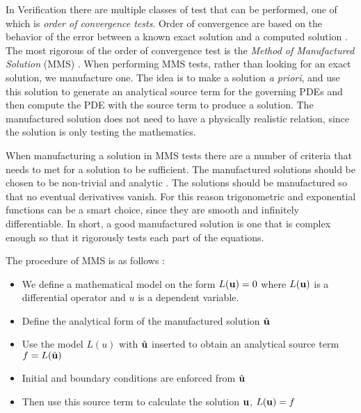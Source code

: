 In Verification there are multiple classes of test that can be performed, one of which is \textit{order of convergence tests}. Order of convergence are based on the behavior of the error between a known exact solution and a computed solution \cite{Roache2002}. The most rigorous of the order of convergence test is the \textit{Method of Manufactured Solution} (MMS) \cite{Oberkampf2010}. When performing MMS tests, rather than looking for an exact solution, we manufacture one. The idea is to make a solution \textit{a priori}, and use this solution to generate an analytical source term for the governing PDEs and then compute the PDE with the source term to produce a solution. The manufactured solution does not need to have a physically realistic relation, since the solution is only testing the mathematics. \newline

When manufacturing a solution in MMS tests there are a number of criteria that needs to met for a solution to be sufficient. The manufactured solutions should be chosen to be non-trivial and analytic \cite{Oberkampf2010, Roache2002}. The solutions should be manufactured so that no eventual derivatives vanish. For this reason trigonometric and exponential functions can be a smart choice, since they are smooth and infinitely differentiable. In short, a good manufactured solution is one that is complex enough so that it rigorously tests each part of the equations.\newline 

The procedure of MMS is as follows \cite{Oberkampf2010}:
\begin{itemize}
\item We define a mathematical model on the form $ L(\bold{u}) = 0$ where $L(\bold{u})$ is a differential operator and $u$ is a dependent variable.
\item Define the analytical form of the manufactured solution $\hat{\bold{u}}$
\item Use the model $L(u)$ with $\hat{\bold{u}}$ inserted to obtain an analytical source term $ f = L(\hat{\bold{u}}) $
\item Initial and boundary conditions are enforced from $\hat{\bold{u}}$
\item Then use this source term to calculate the solution $\bold{u}$, $L(\bold{u}) = f $
\end{itemize}

